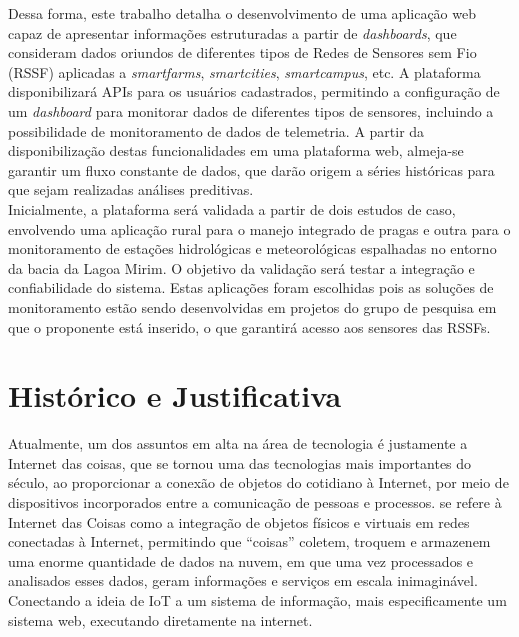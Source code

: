 \documentclass[tcc-proposta]{texufpel}
\begin{document}
Dessa forma, este trabalho detalha o desenvolvimento de uma aplicação web capaz de apresentar informações estruturadas a partir de \textit{dashboards}, que consideram dados oriundos de diferentes tipos de Redes de Sensores sem Fio (RSSF) aplicadas a \textit{smartfarms}, \textit{smartcities}, \textit{smartcampus}, etc. A plataforma disponibilizará APIs para os usuários cadastrados, permitindo a configuração de um \textit{dashboard} para monitorar dados de diferentes tipos de sensores, incluindo a possibilidade de monitoramento de dados de telemetria. A partir da disponibilização destas funcionalidades em uma plataforma web, almeja-se garantir um fluxo constante de dados, que darão origem a séries históricas para que sejam realizadas análises preditivas. \\

Inicialmente, a plataforma será validada a partir de dois estudos de caso, envolvendo uma aplicação rural para o manejo integrado de pragas e outra para o monitoramento de estações hidrológicas e meteorológicas espalhadas no entorno da bacia da Lagoa Mirim. O objetivo da validação será testar a integração e confiabilidade do sistema. Estas aplicações foram escolhidas pois as soluções de monitoramento estão sendo desenvolvidas em projetos do grupo de pesquisa em que o proponente está inserido, o que garantirá acesso aos sensores das RSSFs.




\chapter{Histórico e Justificativa}
Atualmente, um dos assuntos em alta na área de tecnologia é justamente a Internet das coisas, que se tornou uma das tecnologias mais importantes do século, ao proporcionar a conexão de objetos do cotidiano à Internet, por meio de dispositivos incorporados entre a comunicação de pessoas e processos. \citet{Almeida:2015} se refere à Internet das Coisas como a integração de objetos físicos e virtuais em redes conectadas à Internet, permitindo que “coisas” coletem, troquem e armazenem uma enorme quantidade de dados na nuvem, em que uma vez processados e analisados esses dados, geram informações e serviços em escala inimaginável. Conectando a ideia de IoT a um sistema de informação, mais especificamente um sistema web, executando diretamente na internet.
\\
\end{document}
